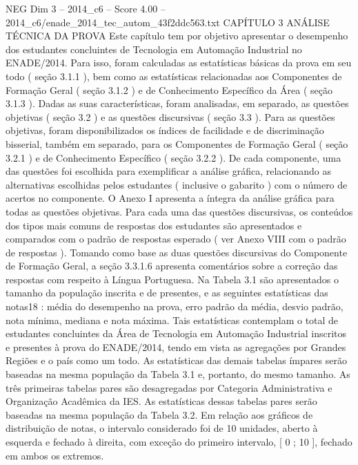 \begin{textsample}{NEG Dim 3 – 2014\_c6 – Score 4.00 – 2014\_c6/enade\_2014\_tec\_autom\_43f2ddc563.txt}  \label{ex:f3_neg_254}
CAPÍTULO 3 ANÁLISE TÉCNICA DA PROVA Este capítulo tem por objetivo apresentar o desempenho dos estudantes concluintes de Tecnologia em Automação Industrial no ENADE/2014.
Para isso, foram calculadas as estatísticas básicas da prova em seu todo ( seção 3.1.1 ), bem como as estatísticas relacionadas aos Componentes de Formação Geral ( seção 3.1.2 ) e de Conhecimento Específico da Área ( seção 3.1.3 ).
Dadas as suas características, foram analisadas, em separado, as questões objetivas ( seção 3.2 ) e as questões discursivas ( seção 3.3 ).
Para as questões objetivas, foram disponibilizados os índices de facilidade e de discriminação bisserial, também em separado, para os Componentes de Formação Geral ( seção 3.2.1 ) e de Conhecimento Específico ( seção 3.2.2 ).
De cada componente, uma das questões foi escolhida para exemplificar a análise gráfica, relacionando as alternativas escolhidas pelos estudantes ( inclusive o gabarito ) com o número de acertos no componente.
O Anexo I apresenta a íntegra da análise gráfica para todas as questões objetivas.
Para cada uma das questões discursivas, os conteúdos dos tipos mais comuns de respostas dos estudantes são apresentados e comparados com o padrão de respostas esperado ( ver Anexo VIII com o padrão de respostas ).
Tomando como base as duas questões discursivas do Componente de Formação Geral, a seção 3.3.1.6 apresenta comentários sobre a correção das respostas com respeito à Língua Portuguesa.
Na Tabela 3.1 são apresentados o tamanho da população inscrita e de presentes, e as seguintes estatísticas das notas18 : média do desempenho na prova, erro padrão da média, desvio padrão, nota mínima, mediana e nota máxima.
Tais estatísticas contemplam o total de estudantes concluintes da Área de Tecnologia em Automação Industrial inscritos e presentes à prova do ENADE/2014, tendo em vista as agregações por Grandes Regiões e o país como um todo.
As estatísticas das demais tabelas ímpares serão baseadas na mesma população da Tabela 3.1 e, portanto, do mesmo tamanho.
As três primeiras tabelas pares são desagregadas por Categoria Administrativa e Organização Acadêmica da IES.
As estatísticas dessas tabelas pares serão baseadas na mesma população da Tabela 3.2.
Em relação aos gráficos de distribuição de notas, o intervalo considerado foi de 10 unidades, aberto à esquerda e fechado à direita, com exceção do primeiro intervalo, [ 0 ; 10 ], fechado em ambos os extremos.

\end{textsample}
